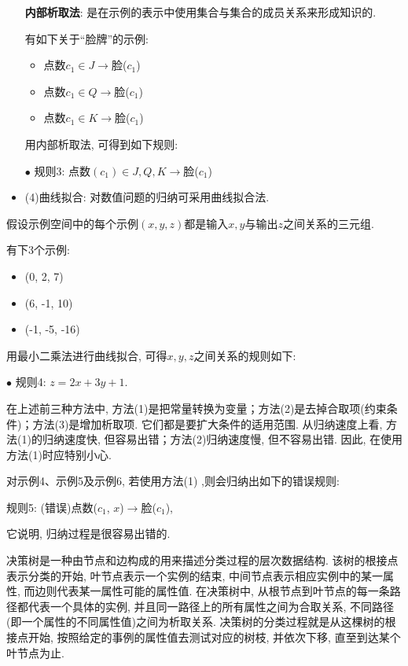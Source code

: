 \begin{itemize}
\textbf{内部析取法}: 是在示例的表示中使用集合与集合的成员关系来形成知识的.

\begin{example}
有如下关于“脸牌”的示例:
\begin{itemize}
\item 点数$c_1\in {J}\rightarrow$脸($c_1$)
\item 点数$c_1\in {Q}\rightarrow$脸($c_1$)
\item 点数$c_1\in {K}\rightarrow$脸($c_1$)
\end{itemize}

用内部析取法, 可得到如下规则:

$\bullet$ 规则3: 点数$(c_1)\in {J, Q, K}\rightarrow$脸($c_1$)
\end{example}
\item (4)曲线拟合: 对数值问题的归纳可采用曲线拟合法.
\end{itemize}
假设示例空间中的每个示例$(x, y, z)$都是输入$x, y$与输出$z$之间关系的三元组.
\begin{example}
有下3个示例:
\begin{itemize}
\item (0, 2, 7)
\item (6, -1, 10)
\item (-1, -5, -16)
\end{itemize}

用最小二乘法进行曲线拟合, 可得$x, y, z$之间关系的规则如下:

$\bullet$ 规则4: $z=2x+3y+1$.
\end{example}
\begin{remark}
在上述前三种方法中, 方法(1)是把常量转换为变量；方法(2)是去掉合取项(约束条件)；方法(3)是增加析取项. 它们都是要扩大条件的适用范围. 从归纳速度上看, 方法(1)的归纳速度快, 但容易出错；方法(2)归纳速度慢, 但不容易出错. 因此, 在使用方法(1)时应特别小心.

\begin{example}
对示例4、示例5及示例6, 若使用方法(1) ,则会归纳出如下的错误规则:

规则5: (错误)点数($c_1$, $x$)$\rightarrow$脸($c_1$),

它说明, 归纳过程是很容易出错的.
\end{example}
\end{remark}

决策树是一种由节点和边构成的用来描述分类过程的层次数据结构. 该树的根接点表示分类的开始, 叶节点表示一个实例的结束, 中间节点表示相应实例中的某一属性, 而边则代表某一属性可能的属性值.
在决策树中, 从根节点到叶节点的每一条路径都代表一个具体的实例, 并且同一路径上的所有属性之间为合取关系, 不同路径(即一个属性的不同属性值)之间为析取关系.
决策树的分类过程就是从这棵树的根接点开始, 按照给定的事例的属性值去测试对应的树枝, 并依次下移, 直至到达某个叶节点为止.

